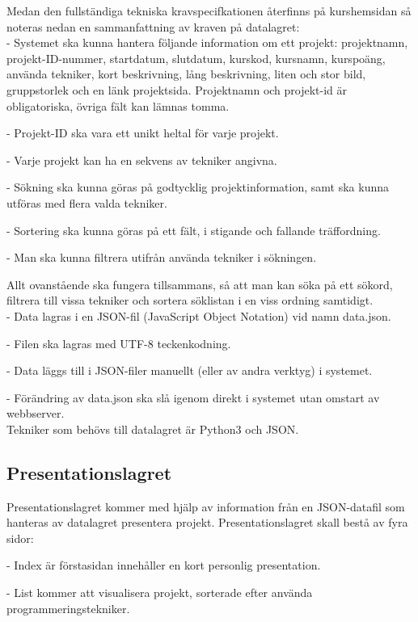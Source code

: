 \documentclass{TDP003mall}
\begin{document}
Medan den fullständiga tekniska kravspecifkationen återfinns på kurshemsidan så noteras nedan en sammanfattning av kraven på datalagret:\\

- Systemet ska kunna hantera följande information om ett projekt: projektnamn, projekt-ID-nummer, startdatum, slutdatum, kurskod, kursnamn, kurspoäng, använda tekniker, kort beskrivning, lång beskrivning, liten och stor bild, gruppstorlek och en länk projektsida. Projektnamn och projekt-id är obligatoriska, övriga fält kan lämnas tomma.

- Projekt-ID ska vara ett unikt heltal för varje projekt.

- Varje projekt kan ha en sekvens av tekniker angivna.

- Sökning ska kunna göras på godtycklig projektinformation, samt ska kunna utföras med flera valda tekniker.

- Sortering ska kunna göras på ett fält, i stigande och fallande träffordning.

- Man ska kunna filtrera utifrån använda tekniker i sökningen.

{Allt ovanstående ska fungera tillsammans, så att man kan söka på ett sökord, filtrera till vissa tekniker och sortera söklistan i en viss ordning samtidigt.}
\\

- Data lagras i en JSON-fil (JavaScript Object Notation) vid namn data.json.

- Filen ska lagras med UTF-8 teckenkodning.

- Data läggs till i JSON-filer manuellt (eller av andra verktyg) i systemet.

- Förändring av data.json ska slå igenom direkt i systemet utan omstart av webbserver.\\

Tekniker som behövs till datalagret är Python3 och JSON.

\subsection*{Presentationslagret}
%
 Presentationslagret kommer med hjälp av information från en JSON-datafil som hanteras av datalagret presentera projekt.
Presentationslagret skall bestå av fyra sidor:

- Index är förstasidan innehåller en kort personlig presentation.

- List kommer att visualisera projekt, sorterade efter använda programmeringstekniker.
\end{document}
